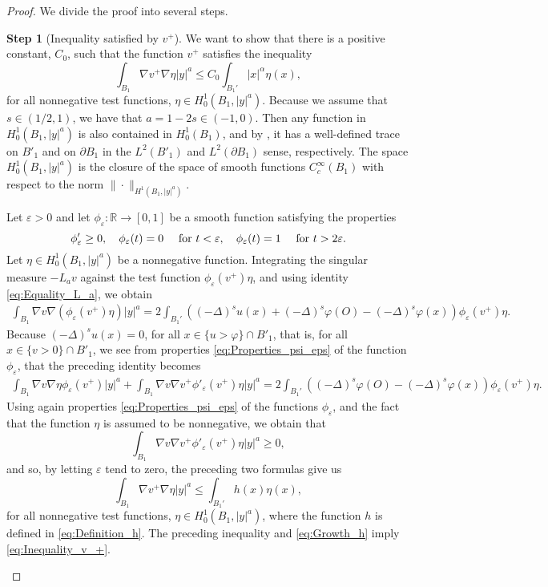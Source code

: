 \documentclass[11pt,reqno]{amsart}
\theoremstyle{definition}
\newtheorem{step}{Step}
\theoremstyle{remark}
\begin{document}
\begin{proof}
We divide the proof into several steps. 

\setcounter{step}{0}
\begin{step}[Inequality satisfied by $v^+$]
\label{step:Inequality_v_+}
We want to show that there is a positive constant, $C_0$, such that the function $v^+$ satisfies the inequality
\begin{equation}
\label{eq:Inequality_v_+}
\int_{B_1} \nabla v^+\nabla\eta|y|^a \leq  C_0 \int_{B_1'}  |x|^{\alpha}\eta(x),
\end{equation}
for all nonnegative test functions, $\eta\in H^1_0(B_1, |y|^a)$. Because we assume that $s\in (1/2,1)$, we have that $a=1-2s \in (-1,0)$. Then any function in $H^1_0(B_1,|y|^a)$ is also contained in $H^1_0(B_1)$, and by \cite[Theorem 5.5.1]{Evans}, it has a well-defined trace on $B'_1$ and on $\partial B_1$ in the $L^2(B'_1)$ and $L^2(\partial B_1)$ sense, respectively. The space $H^1_0(B_1,|y|^a)$ is the closure of the space of smooth functions $C^{\infty}_c(B_1)$ with respect to the norm $\|\cdot\|_{H^1(B_1,|y|^a)}$.

Let ${\varepsilon}>0$ and let $\phi_{\varepsilon}:{\mathbb{R}}\rightarrow [0,1]$ be a smooth function satisfying the properties
\begin{equation}
\label{eq:Properties_psi_eps}
\phi_{\varepsilon}' \geq 0,\quad \phi_{\varepsilon}(t)=0\quad\hbox{ for } t<{\varepsilon},\quad \phi_{\varepsilon}(t)=1\quad\hbox{ for } t>2{\varepsilon}.
\end{equation}
Let $\eta\in H^1_0(B_1,|y|^a)$ be a nonnegative function. Integrating the singular measure $-L_a v$ against the test function $\phi_{\varepsilon}(v^+)\eta$, and using identity \eqref{eq:Equality_L_a}, we obtain 
\begin{align*}
\int_{B_1} \nabla v\nabla (\phi_{\varepsilon}(v^+)\eta) |y|^a = 2\int_{B_1'} \left((-\Delta)^su(x)+(-\Delta)^s\varphi(O)-(-\Delta)^s\varphi(x)\right) \phi_{\varepsilon}(v^+)\eta.
\end{align*}
Because $(-\Delta)^s u(x)=0$, for all $x\in\{u>\varphi\}\cap B'_1$, that is, for all $x\in\{v>0\}\cap B'_1$, we see from properties \eqref{eq:Properties_psi_eps} of the function $\phi_{\varepsilon}$, that the preceding identity becomes
\begin{align*}
\int_{B_1} \nabla v\nabla \eta \phi_{\varepsilon}(v^+)|y|^a + \int_{B_1} \nabla v \nabla v^+\phi'_{\varepsilon}(v^+)\eta |y|^a = 2\int_{B_1'} \left((-\Delta)^s\varphi(O)-(-\Delta)^s\varphi(x)\right) \phi_{\varepsilon}(v^+)\eta.
\end{align*}
Using again properties \eqref{eq:Properties_psi_eps} of the functions $\phi_{\varepsilon}$, and the fact that the function $\eta$ is assumed to be nonnegative, we obtain that 
$$
\int_{B_1} \nabla v \nabla v^+\phi'_{\varepsilon}(v^+)\eta |y|^a \geq 0,
$$
and so, by letting ${\varepsilon}$ tend to zero, the preceding two formulas give us 
$$
\int_{B_1} \nabla v^+\nabla\eta|y|^a \leq \int_{B_1'} h(x)\eta(x),
$$
for all nonnegative test functions, $\eta\in H^1_0(B_1,|y|^a)$, where the function $h$ is defined in \eqref{eq:Definition_h}. The preceding inequality and \eqref{eq:Growth_h} imply \eqref{eq:Inequality_v_+}. 
\end{step}


\end{proof}
\end{document}
